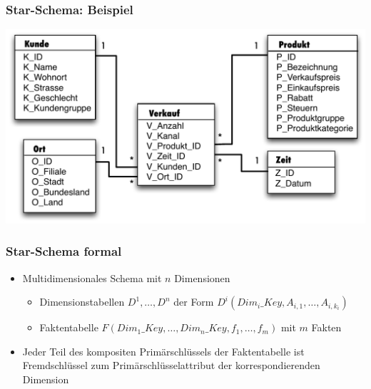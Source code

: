         
        
            \begin{frame}
        
            \frametitle{Star-Schema: Beispiel}
        
            \begin{center}
              \includegraphics[height=\textAreaHeight,width=\textwidth,keepaspectratio]{fig6/Star-Schema.pdf}
            \end{center}
        
        
            \end{frame}
        
            \begin{frame}
        
            \frametitle{Star-Schema formal}
        
            \begin{itemize}
            \item Multidimensionales Schema mit $n$ Dimensionen
              \begin{itemize}
              \item Dimensionstabellen $D^1, \dots, D^n$ der Form $D^i(Dim_i\_Key,
                A_{i,1}, \dots, A_{i,{k_i}})$
              \item Faktentabelle $F(Dim_1\_Key, \dots, Dim_n\_Key, f_1, \dots, f_m)$ mit $m$ Fakten
              \end{itemize}
            \item Jeder Teil des kompositen Primärschlüssels der Faktentabelle ist
              Fremdschlüssel zum Primärschlüsselattribut der korrespondierenden
              Dimension
            \end{itemize}
        
            \end{frame}
        
